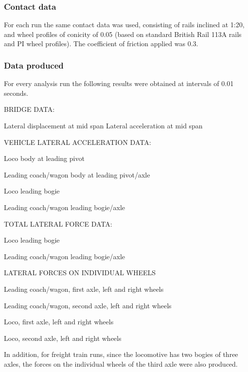 \subsubsection{Contact data}
For each run the same contact data was used, consisting of rails inclined at 1:20, and wheel profiles of conicity of 0.05 (based on standard British Rail 113A rails and PI wheel profiles). The coefficient of friction applied was 0.3.


\subsubsection{Data produced}

For every analysis run the following results were obtained at intervals of 0.01 seconds.

BRIDGE DATA:

Lateral displacement at mid span Lateral acceleration at mid span

\vspace*{\baselineskip}

VEHICLE LATERAL ACCELERATION DATA:

Loco body at leading pivot

Leading coach/wagon body at leading pivot/axle 

Loco leading bogie

Leading coach/wagon leading bogie/axle

\vspace*{\baselineskip}

TOTAL LATERAL FORCE DATA:

Loco leading bogie

Leading coach/wagon leading bogie/axle

\vspace*{\baselineskip}

LATERAL FORCES ON INDIVIDUAL WHEELS

Leading coach/wagon, first axle, left and right wheels 

Leading coach/wagon, second axle, left and right wheels 

Loco, first axle, left and right wheels

Loco, second axle, left and right wheels

\vspace*{\baselineskip}

In addition, for freight train runs, since the locomotive has two bogies of three axles, the forces on the individual wheels of the third axle were also produced.

